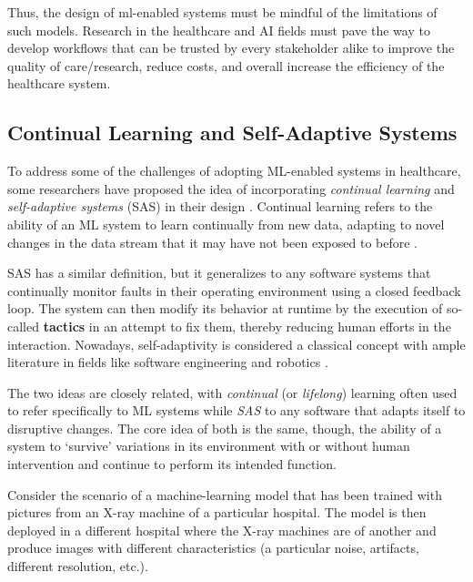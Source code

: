 \documentclass[../main.tex]{subfiles}
\begin{document}

    Thus, the design of ml-enabled systems must be mindful of the limitations of such models. Research in the healthcare and AI fields must pave the way to develop workflows that can be trusted by every stakeholder alike to improve the quality of care/research, reduce costs, and overall increase the efficiency of the healthcare system.


    \subsection{Continual Learning and Self-Adaptive Systems} \label{sec:lifelong_adaptive_systems}

    To address some of the challenges of adopting ML-enabled systems in healthcare, some researchers have proposed the idea of incorporating \textit{continual learning} and \textit{self-adaptive systems} (SAS) in their design \cite{casimiro_self-adaptive_2022,huyen_designing_2022}. Continual learning refers to the ability of an ML system to learn continually from new data, adapting to novel changes in the data stream that it may have not been exposed to before \cite{parisi_continual_2019}.
    
    SAS has a similar definition, but it generalizes to any software systems that continually monitor faults in their operating environment using a closed feedback loop. The system can then modify its behavior at runtime by the execution of so-called \textbf{tactics} in an attempt to fix them, thereby reducing human efforts in the interaction. Nowadays, self-adaptivity is considered a classical concept with ample literature in fields like software engineering and robotics \cite{macias-escrivaSelfadaptiveSystemsSurvey2013,casimiro_self-adaptive_2022}.

    \clearpage
    
    The two ideas are closely related, with \textit{continual} (or \textit{lifelong}) learning often used to refer specifically to ML systems while \textit{SAS} to any software that adapts itself to disruptive changes. The core idea of both is the same, though, the ability of a system to `survive' variations in its environment with or without human intervention and continue to perform its intended function. %

    Consider the scenario of a machine-learning model that has been trained with pictures from an X-ray machine of a particular hospital. The model is then deployed in a different hospital where the X-ray machines are of another and produce images with different characteristics (a particular noise, artifacts, different resolution, etc.). 
    
\end{document}
